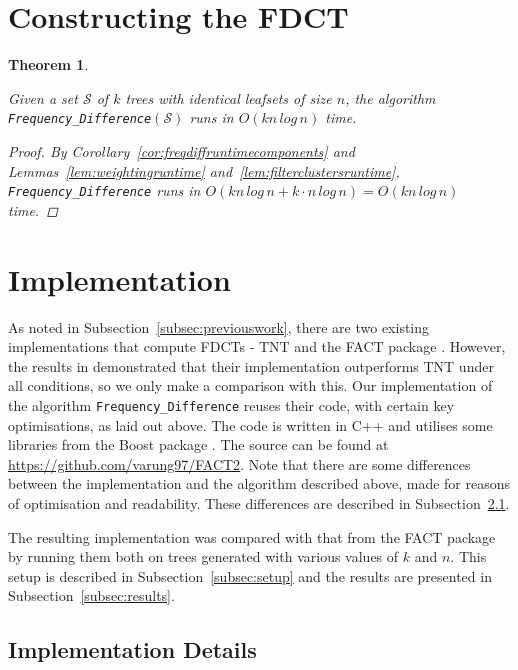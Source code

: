 \documentclass[12pt,a4paper]{article}
\newtheorem{freqdiffruntime}[incompatibility]{Theorem}
\begin{document}
    \section{Constructing the FDCT}
    \label{sec:freqdiffconstruction}

    \begin{freqdiffruntime}
        \label{theorem:freqdiffruntime}

        Given a set $\mathcal{S}$ of $k$ trees with identical leafsets of size $n$, the algorithm \texttt{Frequency\_Difference}$(\mathcal{S})$ runs in $O(kn\,log\,n)$ time.

        \begin{proof}
            By Corollary~\ref{cor:freqdiffruntimecomponents} and Lemmas~\ref{lem:weightingruntime} and~\ref{lem:filterclustersruntime}, \texttt{Frequency\_Difference} runs in $O(kn\,log\,n + k \cdot n\,log\,n) = O(kn\,log\,n)$ time.
        \end{proof}
    \end{freqdiffruntime}

    \section{Implementation}

    As noted in Subsection~\ref{subsec:previouswork}, there are two existing implementations that compute FDCTs - TNT \citep{goloboff2008tnt} and the FACT package \citep{jansson2016improved}. However, the results in \cite{jansson2018algorithms} demonstrated that their implementation outperforms TNT under all conditions, so we only make a comparison with this. Our implementation of the algorithm \texttt{Frequency\_Difference} reuses their code, with certain key optimisations, as laid out above. The code is written in C++ and utilises some libraries from the Boost package \citep{BoostLibrary}. The source can be found at \url{https://github.com/varung97/FACT2}. Note that there are some differences between the implementation and the algorithm described above, made for reasons of optimisation and readability. These differences are described in Subsection~\ref{subsec:implementationdetails}.

    The resulting implementation was compared with that from the FACT package by running them both on trees generated with various values of $k$ and $n$. This setup is described in Subsection~\ref{subsec:setup} and the results are presented in Subsection~\ref{subsec:results}.

    \subsection{Implementation Details}
    \label{subsec:implementationdetails}
\end{document}
